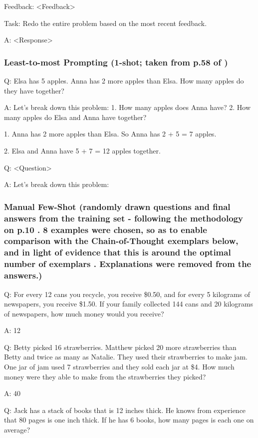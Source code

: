 \documentclass[11pt]{article}
\begin{document}
Feedback: <Feedback>

Task: Redo the entire problem based on the most recent feedback.

A: <Response>

\subsubsection*{Least-to-most Prompting (1-shot; taken from p.58 of \citealp{zhou_least--most_2023})}

Q: Elsa has 5 apples. Anna has 2 more apples than Elsa. How many apples do they have together?

A: Let's break down this problem: 1. How many apples does Anna have? 2. How many apples do Elsa and Anna have together?

1. Anna has 2 more apples than Elsa. So Anna has 2 + 5 = 7 apples.

2. Elsa and Anna have 5 + 7 = 12 apples together.

Q: <Question>

A: Let's break down this problem:

\subsubsection*{Manual Few-Shot (randomly drawn questions and final answers from the training set - following the methodology on p.10 \citealp{brown_language_2020}. 8 examples were chosen, so as to enable comparison with the Chain-of-Thought exemplars below, and in light of evidence that this is around the optimal number of exemplars \cite{min_rethinking_2022}. Explanations were removed from the answers.)}

Q: For every 12 cans you recycle, you receive \$0.50, and for every 5 kilograms of newspapers, you receive \$1.50. If your family collected 144 cans and 20 kilograms of newspapers, how much money would you receive?

A: 12

Q: Betty picked 16 strawberries. Matthew picked 20 more strawberries than Betty and twice as many as Natalie. They used their strawberries to make jam. One jar of jam used 7 strawberries and they sold each jar at \$4. How much money were they able to make from the strawberries they picked?

A: 40

Q: Jack has a stack of books that is 12 inches thick. He knows from experience that 80 pages is one inch thick. If he has 6 books, how many pages is each one on average?
\end{document}
